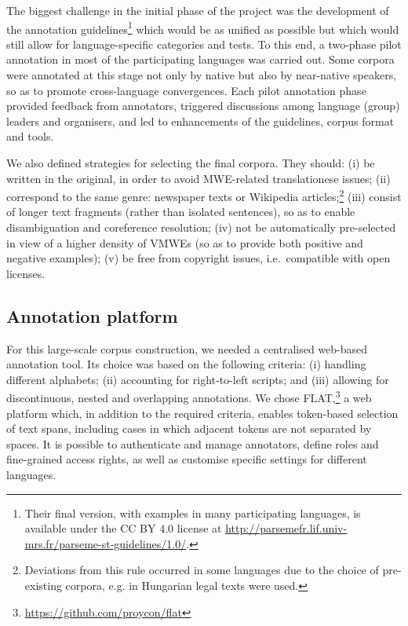 \documentclass[output=paper,
modfonts,
]{langscibook}
\begin{document}
The biggest challenge in the initial phase of the project was the development of the annotation guidelines\footnote{Their final version, with examples in many participating languages, is available under the CC BY 4.0 license at %
\url{http://parsemefr.lif.univ-mrs.fr/parseme-st-guidelines/1.0/}.} which would be as unified as possible but which would still allow for language-specific categories and tests. To this end, a two-phase pilot annotation in most of the participating languages was carried out. Some corpora were annotated at this stage not only by native but also by near-native speakers, so as to promote cross-language convergences. Each pilot annotation phase provided feedback from annotators, triggered discussions among language (group) leaders and organisers, and led to enhancements of the guidelines, corpus format and tools. 

We also defined strategies for selecting the final corpora. They should: (i) be written in the original, 
 in order to avoid  MWE-related translationese issues; (ii) correspond to the same genre: newspaper texts or Wikipedia articles;\footnote{Deviations from this rule occurred in some languages due to the choice of pre-existing corpora, e.g. in Hungarian legal texts were used.} (iii) consist of longer text fragments (rather than isolated sentences), so as to enable disambiguation and coreference resolution; (iv) not be automatically pre-selected in view of a higher density of VMWEs (so as to provide both positive and negative examples); (v) be free from copyright issues, i.e.\ compatible with open licenses. 

\subsection{Annotation platform}
\label{sec:flat}
%
For this large-scale corpus construction, we needed a centralised web-based annotation tool. Its choice was based on the
following criteria: (i) handling different alphabets; (ii) accounting for right-to-left scripts; and (iii) allowing for
discontinuous, nested and overlapping annotations. We chose
FLAT,\footnote{\scriptsize\url{https://github.com/proycon/flat}} a web platform which, in addition to the required criteria, enables token-based selection of text spans,
including cases in which adjacent tokens are not separated by spaces. It is possible to authenticate and manage
annotators, define roles and fine-grained access rights, as well as customise specific settings for different languages.
\end{document}
